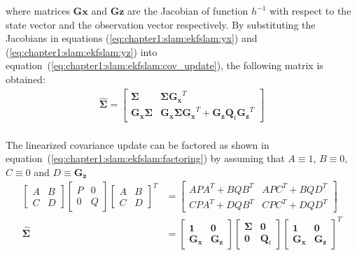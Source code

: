 where matrices $\bm{Gx}$ and $\bm{Gz}$ are the Jacobian of function $h^{-1}$ with respect to the state vector and the observation vector respectively. By substituting the Jacobians in equations (\ref{eq:chapter1:slam:ekfslam:yx}) and (\ref{eq:chapter1:slam:ekfslam:yz}) into equation~(\ref{eq:chapter1:slam:ekfslam:cov_update}), the following matrix is obtained:
\begin{align}
    \hat{\bm{\Sigma}} = \begin{bmatrix}
        \bm{\Sigma} & \bm{\Sigma} \bm{G_x}^T \\
        \bm{G_x} \bm{\Sigma} & \bm{G_x} \bm{\Sigma} \bm{G_x}^T + \bm{G_z} \bm{Q}_t \bm{G_z}^T
    \end{bmatrix}
    \label{eq:chapter1:slam:ekfslam:cov_update_full}
\end{align}\\

The linearized covariance update can be factored as shown in equation~(\ref{eq:chapter1:slam:ekfslam:factoring}) by assuming that $A \equiv 1$, $B \equiv 0$, $C \equiv 0$ and $D \equiv \bm{G_z}$
\begin{align}
    \begin{bmatrix}
        A & B \\ C & D
    \end{bmatrix} \begin{bmatrix}
        P & 0 \\ 0 & Q
    \end{bmatrix} \begin{bmatrix}
        A & B \\ C & D
    \end{bmatrix}^T &= \begin{bmatrix}
            APA^T + BQB^T & APC^T + BQD^T \\
            CPA^T + DQB^T & CPC^T + DQD^T
    \end{bmatrix}
    \label{eq:chapter1:slam:ekfslam:factoring}\\
    \hat{\bm{\Sigma}} &= \begin{bmatrix}
        \bm{1} & \bm{0} \\ \bm{G_x} & \bm{G_z}
    \end{bmatrix} \begin{bmatrix}
        \bm{\Sigma} & \bm{0} \\ \bm{0} & \bm{Q}_t
    \end{bmatrix} \begin{bmatrix}
        \bm{1} & \bm{0} \\ \bm{G_x} & \bm{G_z}
    \end{bmatrix}^T
    \label{eq:chapter1:slam:ekfslam:factored_cov_update}\\
\end{align}

